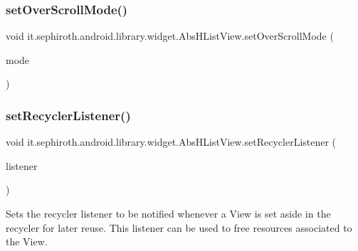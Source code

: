 \subsubsection{\texorpdfstring{set\+Over\+Scroll\+Mode()}{setOverScrollMode()}}
{\footnotesize\ttfamily void it.\+sephiroth.\+android.\+library.\+widget.\+Abs\+H\+List\+View.\+set\+Over\+Scroll\+Mode (\begin{DoxyParamCaption}\item[{int}]{mode }\end{DoxyParamCaption})}

\mbox{\label{classit_1_1sephiroth_1_1android_1_1library_1_1widget_1_1_abs_h_list_view_a3eadd4738e3c529aafefa4f6bb1f5b94}} 
\subsubsection{\texorpdfstring{set\+Recycler\+Listener()}{setRecyclerListener()}}
{\footnotesize\ttfamily void it.\+sephiroth.\+android.\+library.\+widget.\+Abs\+H\+List\+View.\+set\+Recycler\+Listener (\begin{DoxyParamCaption}\item[{Recycler\+Listener}]{listener }\end{DoxyParamCaption})}

Sets the recycler listener to be notified whenever a View is set aside in the recycler for later reuse. This listener can be used to free resources associated to the View.


